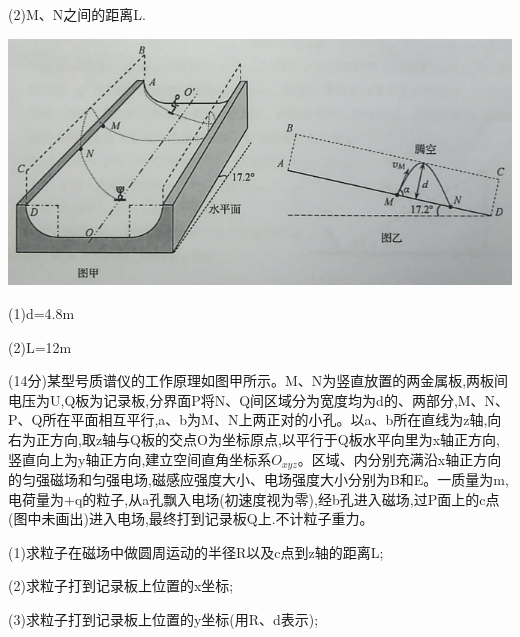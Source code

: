 (2)M、N之间的距离L.\begin{center}\includegraphics[]{img/image14.png}\end{center}
\begin{solution}{4cm}
    (1)d=4.8m

    (2)L=12m
\end{solution}
\newpage
\question[6] (14分)某型号质谱仪的工作原理如图甲所示。M、N为竖直放置的两金属板,两板间电压为U,Q板为记录板,分界面P将N、Q间区域分为宽度均为d的\uppercase\expandafter{}、\uppercase\expandafter{}两部分,M、N、P、Q所在平面相互平行,a、b为M、N上两正对的小孔。以a、b所在直线为z轴,向右为正方向,取z轴与Q板的交点O为坐标原点,以平行于Q板水平向里为x轴正方向,竖直向上为y轴正方向,建立空间直角坐标系$O_{xyz}$。区域\uppercase\expandafter{}、\uppercase\expandafter{}内分别充满沿x轴正方向的匀强磁场和匀强电场,磁感应强度大小、电场强度大小分别为B和E。一质量为m,电荷量为+q的粒子,从a孔飘入电场(初速度视为零),经b孔进入磁场,过P面上的c点(图中未画出)进入电场,最终打到记录板Q上.不计粒子重力。

(1)求粒子在磁场中做圆周运动的半径R以及c点到z轴的距离L;

(2)求粒子打到记录板上位置的x坐标;

(3)求粒子打到记录板上位置的y坐标(用R、d表示);

